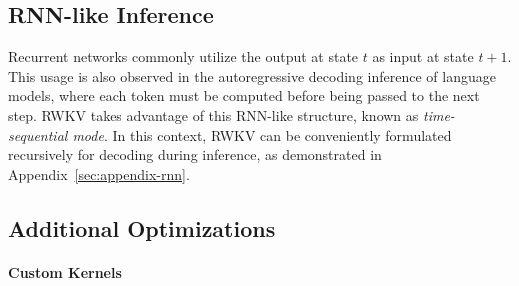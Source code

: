 \documentclass[11pt]{article}
\begin{document}
\subsection{RNN-like Inference} \label{rnn_inference}

Recurrent networks commonly utilize the output at state $t$ as input at state $t+1$. This usage is also observed in the autoregressive decoding inference of language models, where each token must be computed before being passed to the next step. RWKV takes advantage of this RNN-like structure, known as \textit{time-sequential mode}. In this context, RWKV can be conveniently formulated recursively for decoding during inference, as demonstrated in Appendix~\ref{sec:appendix-rnn}.



\subsection{Additional Optimizations} \label{adding_opts}


\paragraph{Custom Kernels} \label{custom_kernel}

\end{document}
